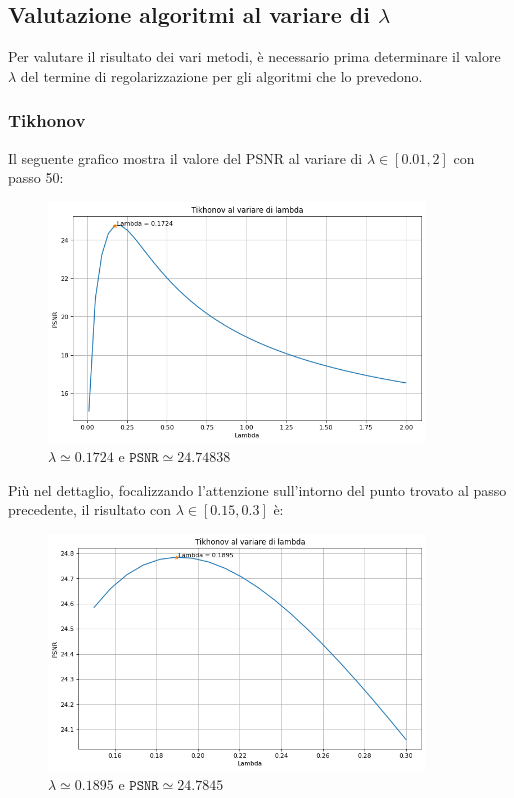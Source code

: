 \documentclass[11pt]{article}
\begin{document}
\subsection*{Valutazione algoritmi al variare di $\lambda$}
Per valutare il risultato dei vari metodi, è necessario prima determinare il valore $\lambda$ del termine di regolarizzazione per gli algoritmi che lo prevedono.
\subsubsection*{Tikhonov}
Il seguente grafico mostra il valore del PSNR al variare di $\lambda \in [0.01, 2]$ con passo 50:
\begin{figure}[H]
    \centering
    \includegraphics[width=10cm]{tikhonov_lambda1.png}
    \caption{$\lambda \simeq 0.1724$ e $\texttt{PSNR} \simeq 24.74838$}
    \label{fig:tikhonov_lambda1}
\end{figure}
Più nel dettaglio, focalizzando l'attenzione sull'intorno del punto trovato al passo precedente, il risultato con $\lambda \in [0.15, 0.3]$ è:
\begin{figure}[H]
    \centering
    \includegraphics[width=10cm]{tikhonov_lambda2.png}
    \caption{$\lambda \simeq 0.1895$ e $\texttt{PSNR} \simeq 24.7845$}
    \label{fig:tikhonov_lambda2}
\end{figure}
\end{document}
